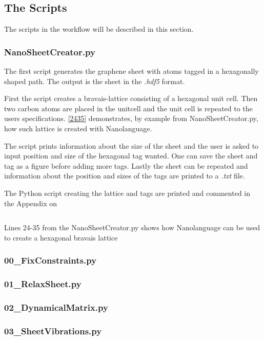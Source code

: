 
\subsection{The Scripts}
The scripts in the workflow will be described in this section.
\subsubsection{NanoSheetCreator.py}\label{NSCS}
The first script generates the graphene sheet with atoms tagged in a hexagonally shaped path. The output is the sheet in the \textit{.hdf5} format.

First the script creates a bravais-lattice consisting of a hexagonal unit cell. Then two carbon atoms are placed in the unitcell and the unit cell is repeated to the users specifications. \cref{2435} demonstrates, by example from NanoSheetCreator.py, how such lattice is created with Nanolanguage.

The script prints information about the size of the sheet and the user is asked to input position and size of the hexagonal tag wanted. One can save the sheet and tag as a figure before adding more tags. Lastly the sheet can be repeated and information about the position and sizes of the tags are printed to a \textit{.txt} file.

The Python script creating the lattice and tags are printed and commented in the Appendix on 
\onecolumngrid

\begin{listing}
 \inputminted[python3=true,bgcolor=Black,linenos=true,firstline=24,lastline=35]{python}{Listings/NanoSheetCreator.py}
 \caption{Lines 24-35 from the NanoSheetCreator.py shows how Nanolanguage can be used to create a hexagonal bravais lattice}
 \label{2435}
\end{listing}
\twocolumngrid

\subsubsection{00\_FixConstraints.py}\label{00}
\subsubsection{01\_RelaxSheet.py}\label{01}
\subsubsection{02\_DynamicalMatrix.py}\label{02}
\subsubsection{03\_SheetVibrations.py}\label{03}
